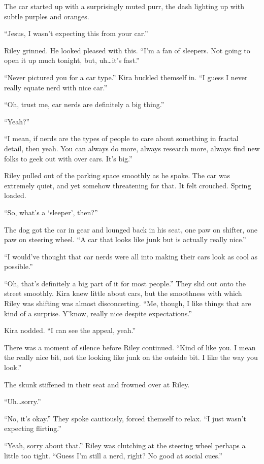 The car started up with a surprisingly muted purr, the dash lighting up with subtle purples and oranges.

``Jesus, I wasn't expecting this from your car.''

Riley grinned. He looked pleased with this. ``I'm a fan of sleepers. Not going to open it up much tonight, but, uh\ldots it's fast.''

``Never pictured you for a car type.'' Kira buckled themself in. ``I guess I never really equate nerd with nice car.''

``Oh, trust me, car nerds are definitely a big thing.''

``Yeah?''

``I mean, if nerds are the types of people to care about something in fractal detail, then yeah. You can always do more, always research more, always find new folks to geek out with over cars. It's big.''

Riley pulled out of the parking space smoothly as he spoke. The car was extremely quiet, and yet somehow threatening for that. It felt crouched. Spring loaded.

``So, what's a `sleeper', then?''

The dog got the car in gear and lounged back in his seat, one paw on shifter, one paw on steering wheel. ``A car that looks like junk but is actually really nice.''

``I would've thought that car nerds were all into making their cars look as cool as possible.''

``Oh, that's definitely a big part of it for most people.'' They slid out onto the street smoothly. Kira knew little about cars, but the smoothness with which Riley was shifting was almost disconcerting. ``Me, though, I like things that are kind of a surprise. Y'know, really nice despite expectations.''

Kira nodded. ``I can see the appeal, yeah.''

There was a moment of silence before Riley continued. ``Kind of like you. I mean the really nice bit, not the looking like junk on the outside bit. I like the way you look.''

The skunk stiffened in their seat and frowned over at Riley.

``Uh\ldots sorry.''

``No, it's okay.'' They spoke cautiously, forced themself to relax. ``I just wasn't expecting flirting.''

``Yeah, sorry about that.'' Riley was clutching at the steering wheel perhaps a little too tight. ``Guess I'm still a nerd, right? No good at social cues.''

